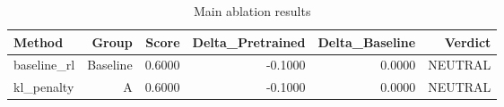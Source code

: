 \begin{table}[htbp]
\centering
\caption{Main ablation results}
\label{tab:main-results}
\begin{tabular}{lrrrrr}
\toprule
\textbf{Method} & \textbf{Group} & \textbf{Score} & \textbf{Delta\_Pretrained} & \textbf{Delta\_Baseline} & \textbf{Verdict} \\
\midrule
baseline\_rl & Baseline & 0.6000 & -0.1000 & 0.0000 & NEUTRAL \\
kl\_penalty & A & 0.6000 & -0.1000 & 0.0000 & NEUTRAL \\
\bottomrule
\end{tabular}
\end{table}